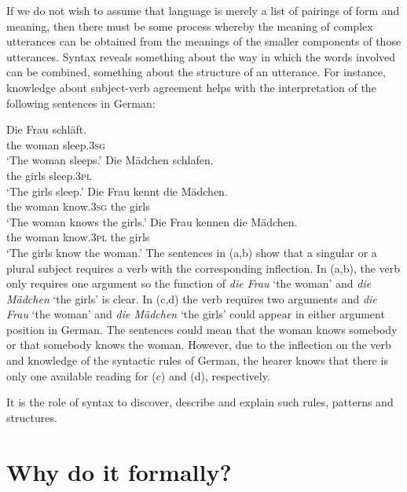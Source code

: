 If we do not wish to assume that language is merely a list of pairings of form and meaning, then
there must be some process whereby the meaning of complex utterances can be obtained from the
meanings of the smaller components of those utterances. Syntax reveals something about the way in which the
words involved can be combined, something about the structure of an utterance. For instance,
knowledge about subject-verb agreement helps with the interpretation of the following sentences in German:

\eal
\label{Beispiel-mit-Kongruenz}
\ex 
\gll Die Frau schläft.\\
     the woman sleep.\textsc{3sg}\\
\glt `The woman sleeps.'
\ex 
\gll Die Mädchen schlafen.\\
     the girls sleep.\textsc{3pl}\\
\glt `The girls sleep.'
\ex 
\gll Die Frau kennt die Mädchen.\\
     the woman know.\textsc{3sg} the girls\\
\glt `The woman knows the girls.'
\ex 
\gll Die Frau kennen die Mädchen.\\
     the woman know.\textsc{3pl} the girls\\
\glt `The girls know the woman.'
\zl
The sentences in (a,b) show that a singular or a plural subject requires a verb with the corresponding inflection. 
In (a,b), the verb only requires one argument so the function of
\emph{die Frau} `the woman' and \emph{die Mädchen} `the girls' is clear.
In (c,d) the verb requires two arguments and \emph{die Frau} `the woman' and \emph{die
  Mädchen} `the girls'
could appear in either argument position in German. The sentences could mean that the woman 
knows somebody or that somebody knows the woman. However, due to the inflection on the verb and
knowledge of the syntactic rules of German, the hearer knows that there is only one available
reading for (c) and (d), respectively.
 
It is the role of syntax to discover, describe and explain such rules, patterns and structures.

\section{Why do it formally?}
\label{sec-formal}

